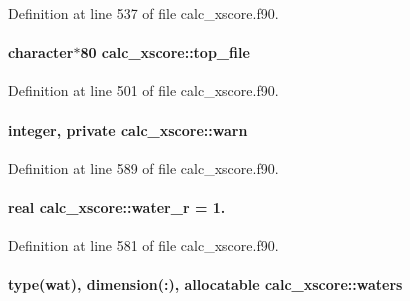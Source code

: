 Definition at line 537 of file calc\-\_\-xscore.\-f90.

\hypertarget{classcalc__xscore_a498fbcaf83d5f0f7c5495059dd9d450b}{
\paragraph[{top\-\_\-file}]{\setlength{\rightskip}{0pt plus 5cm}character$\ast$80 calc\-\_\-xscore\-::top\-\_\-file}}\label{classcalc__xscore_a498fbcaf83d5f0f7c5495059dd9d450b}


Definition at line 501 of file calc\-\_\-xscore.\-f90.

\hypertarget{classcalc__xscore_a080458f001c8de380797fa3e13188f70}{
\paragraph[{warn}]{\setlength{\rightskip}{0pt plus 5cm}integer, private calc\-\_\-xscore\-::warn\hspace{0.3cm}{\ttfamily [private]}}}\label{classcalc__xscore_a080458f001c8de380797fa3e13188f70}


Definition at line 589 of file calc\-\_\-xscore.\-f90.

\hypertarget{classcalc__xscore_a73be5046b1f659dd3ef02d0a3a8f1f6a}{
\paragraph[{water\-\_\-r}]{\setlength{\rightskip}{0pt plus 5cm}real calc\-\_\-xscore\-::water\-\_\-r = 1.}}\label{classcalc__xscore_a73be5046b1f659dd3ef02d0a3a8f1f6a}


Definition at line 581 of file calc\-\_\-xscore.\-f90.

\hypertarget{classcalc__xscore_a0481484877299b3446ae0cf1c6cab1fc}{
\paragraph[{waters}]{\setlength{\rightskip}{0pt plus 5cm}type({\bf wat}), dimension(\-:), allocatable calc\-\_\-xscore\-::waters}}\label{classcalc__xscore_a0481484877299b3446ae0cf1c6cab1fc}


